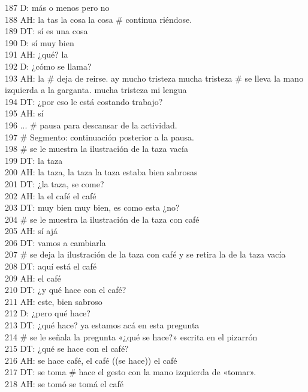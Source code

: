 187 D: más o menos pero no\\
188 AH: la tas la cosa la cosa \# continua riéndose.\\
189 DT: sí es una cosa\\
190 D: sí muy bien\\
191 AH: ¿qué? la\\
192 D: ¿cómo se llama?\\
193 AH: la \# deja de reirse. ay mucho tristeza mucha tristeza \# se lleva la mano izquierda a la garganta. mucha tristeza mi lengua\\
194 DT: ¿por eso le está costando trabajo?\\
195 AH: sí\\
196 ... \# pausa para descansar de la actividad.\\
197 \# Segmento: continuación posterior a la pausa.\\
198 \# se le muestra la ilustración de la taza vacía\\
199 DT: la taza\\
200 AH: la taza, la taza la taza estaba bien sabrosas\\
201 DT: ¿la taza, se come?\\
202 AH: la el café el café\\
203 DT: muy bien muy bien, es como esta ¿no?\\
204 \# se le muestra la ilustración de la taza con café\\
205 AH: sí ajá\\
206 DT: vamos a cambiarla\\
207 \# se deja la ilustración de la taza con café y se retira la de la taza vacía\\
208 DT: aquí está el café\\
209 AH: el café\\
210 DT: ¿y qué hace con el café?\\
211 AH: este, bien sabroso\\
212 D: ¿pero qué hace?\\
213 DT: ¿qué hace? ya estamos acá en esta pregunta\\
214 \# se le señala la pregunta «¿qué se hace?» escrita en el pizarrón\\
215 DT: ¿qué se hace con el café?\\
216 AH: se hace café, el café ((se hace)) el café\\
217 DT: se toma \# hace el gesto con la mano izquierda de «tomar».\\
218 AH: se tomó se tomá el café\\
